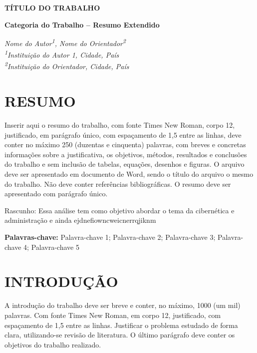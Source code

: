 \documentclass[12pt]{article}
\begin{document}
\onehalfspacing

\begin{center}
\textbf{TÍTULO DO TRABALHO}
\end{center}

\begin{center}
\textbf{Categoria do Trabalho – Resumo Extendido} \\
\end{center}

\begin{center}
\textit{Nome do Autor\textsuperscript{1}, Nome do Orientador\textsuperscript{2}} \\
\textit{\textsuperscript{1}Instituição do Autor 1, Cidade, País} \\
\textit{\textsuperscript{2}Instituição do Orientador, Cidade, País}
\end{center}

\section*{RESUMO}

Inserir aqui o resumo do trabalho, com fonte Times New Roman, corpo 12, justificado, em parágrafo único, com espaçamento de 1,5 entre as linhas, deve conter no máximo 250 (duzentas e cinquenta) palavras, com breves e concretas informações sobre a justificativa, os objetivos, métodos, resultados e conclusões do trabalho e sem inclusão de tabelas, equações, desenhos e figuras. O arquivo deve ser apresentado em documento de Word, sendo o título do arquivo o mesmo do trabalho. Não deve conter referências bibliográficas. O resumo deve ser apresentado com parágrafo único.

Rascunho: Essa análise tem como objetivo abordar o tema da cibernética e administração e ainda ejdnefiowncweicnerrqjiknm

\textbf{Palavras-chave:} Palavra-chave 1; Palavra-chave 2; Palavra-chave 3; Palavra-chave 4; Palavra-chave 5

\section*{INTRODUÇÃO}

A introdução do trabalho deve ser breve e conter, no máximo, 1000 (um mil) palavras. Com fonte Times New Roman, em corpo 12, justificado, com espaçamento de 1,5 entre as linhas. Justificar o problema estudado de forma clara, utilizando-se revisão de literatura. O último parágrafo deve conter os objetivos do trabalho realizado.
\end{document}
